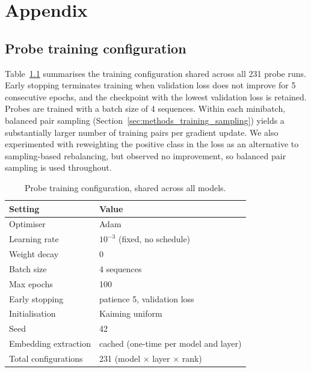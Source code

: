 \documentclass[logo,bsc,singlespacing,parskip]{infthesis}
\begin{document}



\appendix
\chapter{Appendix}
\section{Probe training configuration}
\label{sec:appendix_training}

Table~\ref{tab:training_details} summarises the training configuration
shared across all 231 probe runs. Early stopping terminates training
when validation loss does not improve for 5 consecutive epochs, and the
checkpoint with the lowest validation loss is retained. Probes are trained with a batch size of 4 sequences. Within each minibatch, balanced pair sampling (Section~\ref{sec:methods_training_sampling}) yields a substantially larger number of training pairs per gradient update. We also
experimented with reweighting the positive class in the loss as an
alternative to sampling-based rebalancing, but observed no improvement,
so balanced pair sampling is used throughout.

\begin{table}[H]
\centering
\small
\caption{Probe training configuration, shared across all models.}
\label{tab:training_details}
\begin{tabular}{ll}
\toprule
\textbf{Setting} & \textbf{Value} \\
\midrule
Optimiser            & Adam~\citep{kingma2015adam} \\
Learning rate        & $10^{-3}$ (fixed, no schedule) \\
Weight decay         & 0 \\
Batch size           & 4 sequences \\
Max epochs           & 100 \\
Early stopping       & patience 5, validation loss \\
Initialisation       & Kaiming uniform~\citep{he2015delving} \\
Seed                 & 42 \\
Embedding extraction & cached (one-time per model and layer) \\
Total configurations & 231 (model $\times$ layer $\times$ rank) \\
\bottomrule
\end{tabular}
\end{table}
\end{document}
